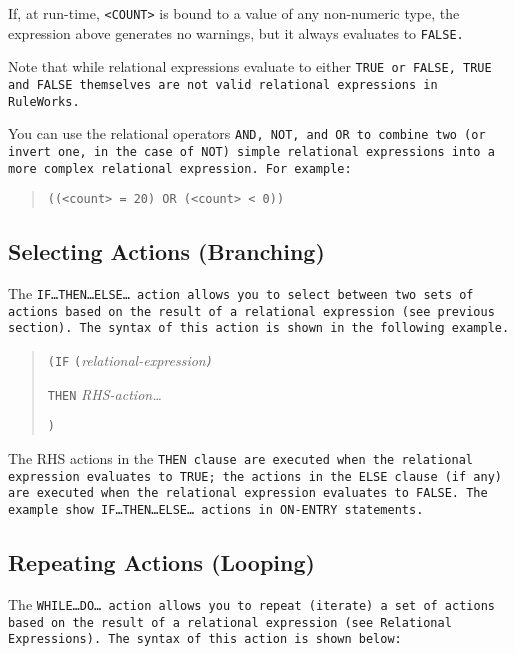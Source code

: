 If, at run-time, \verb|<COUNT>| is bound to a value of any non-numeric
type, the expression above generates no warnings, but it always
evaluates to \tt{FALSE}.

Note that while relational expressions evaluate to either \tt{TRUE} or
\tt{FALSE}, \tt{TRUE} and \tt{FALSE} themselves are not valid
relational expressions in RuleWorks.

You can use the relational operators \tt{AND}, \tt{NOT}, and OR to
combine two (or invert one, in the case of \tt{NOT}) simple relational
expressions into a more complex relational expression. For example:

\begin{quote}
\begin{verbatim}
((<count> = 20) OR (<count> < 0))
\end{verbatim}
\end{quote}

\subsection{Selecting Actions (Branching)}

The \tt{IF}\ldots\tt{THEN}\ldots\tt{ELSE}\ldots{} action allows you to
select between two sets of actions based on the result of a relational
expression (see previous section). The syntax of this action is shown
in the following example.

\begin{quote}
\verb|(IF| \verb|(|\it{relational-expression}\verb|)|\par
\qquad\verb|THEN| \it{RHS-action}\ldots\par
{}\verb|)|
\end{quote}
   
The RHS actions in the \tt{THEN} clause are executed when the
relational expression evaluates to \tt{TRUE}; the actions in the
\tt{ELSE} clause (if any) are executed when the relational expression
evaluates to \tt{FALSE}. The example show
\tt{IF}\ldots\tt{THEN}\ldots\tt{ELSE}\ldots{} actions in \tt{ON-ENTRY}
statements.

\subsection{Repeating Actions (Looping)}

The \tt{WHILE}\ldots\tt{DO}\ldots{} action allows you to repeat
(iterate) a set of actions based on the result of a relational
expression (see Relational Expressions). The syntax of this action is
shown below:

